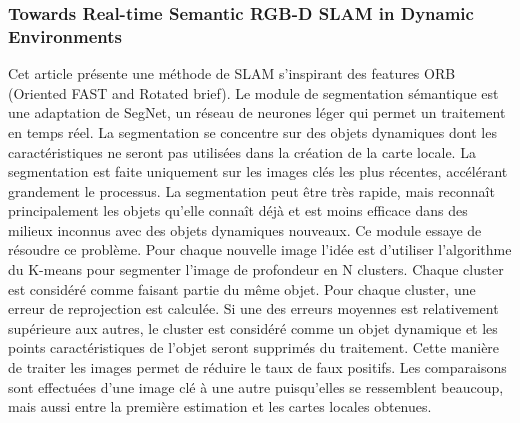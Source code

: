\documentclass[11pt]{article}
\begin{document}
        \pagebreak  

        \subsubsection{Towards Real-time Semantic RGB-D SLAM in Dynamic Environments} 
          Cet article \cite{jiRealtimeSemanticRGBD2021} présente une méthode de SLAM s'inspirant des features ORB (Oriented FAST and Rotated \acrshort{brief}).
          Le module de segmentation sémantique est une adaptation de SegNet, un réseau de neurones léger qui permet un traitement en temps réel.
          La segmentation se concentre sur des objets dynamiques dont les caractéristiques ne seront pas utilisées dans la création de 
          la carte locale. La segmentation est faite uniquement sur les images clés les plus récentes, accélérant grandement le processus.
          La segmentation peut être très rapide, mais reconnaît principalement les objets qu'elle connaît déjà et est moins efficace dans des 
          milieux inconnus avec des objets dynamiques nouveaux. Ce module essaye de résoudre ce problème.
          Pour chaque nouvelle image l'idée est d'utiliser l'algorithme du K-means pour segmenter l'image de profondeur en N clusters.
          Chaque cluster est considéré comme faisant partie du même objet. Pour chaque cluster, une erreur de reprojection est calculée. Si une 
          des erreurs moyennes est relativement supérieure aux autres, le cluster est considéré comme un objet dynamique et les points caractéristiques
          de l'objet seront supprimés du traitement. Cette manière de traiter les images permet de réduire le taux de faux positifs. 
          Les comparaisons sont effectuées d'une image clé à une autre puisqu'elles se ressemblent beaucoup, mais aussi entre la première estimation
          et les cartes locales obtenues.

        \pagebreak
\end{document}
